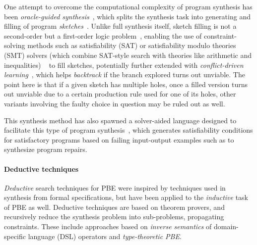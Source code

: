 \documentclass{article}
\begin{document}
One attempt to overcome the computational complexity of program synthesis
has been \emph{oracle-guided synthesis}~\citep{solar2008program},
which splits the synthesis task into generating and filling of program
\emph{sketches}~\citep{murali2017neural}.
Unlike full synthesis itself, sketch filling is not a second-order but a
first-order logic problem~\citep{gulwani2017program}, enabling the use of constraint-solving methods
such as satisfiability (SAT) or satisfiability modulo theories (SMT) solvers
(which combine SAT-style search with theories like arithmetic and inequalities)%
~\citep{akiba2013calibrating,alur2013syntax,alur2016sygus,rosette,architecture}
to fill sketches, potentially further extended with
\emph{conflict-driven learning}~\citep{feng2018program,hornclauses},
which helps \emph{backtrack} if the branch explored turns out unviable.
The point here is that if a given sketch has multiple holes,
once a filled version turns out unviable due to a certain production rule used for one of its holes,
other variants involving the faulty choice in question may be ruled out as well.

This synthesis method has also spawned a solver-aided language
designed to facilitate this type of program synthesis~\citep{rosette},
which generates satisfiability conditions for satisfactory programs
based on failing input-output examples such as to synthesize program repairs.


\paragraph{Deductive techniques} \label{sec:deductivepbe}

\emph{Deductive} search techniques for PBE were inspired by
techniques used in synthesis from formal specifications,
but have been applied to the \emph{inductive} task of PBE as well.
Deductive techniques are based on theorem provers,
and recursively reduce the synthesis problem into sub-problems,
propagating constraints.
These include approaches based on \emph{inverse semantics} of
domain-specific language (DSL) operators and \emph{type-theoretic PBE}.
\end{document}
